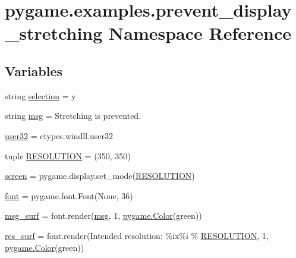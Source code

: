 \hypertarget{namespacepygame_1_1examples_1_1prevent__display__stretching}{}\section{pygame.\+examples.\+prevent\+\_\+display\+\_\+stretching Namespace Reference}
\label{namespacepygame_1_1examples_1_1prevent__display__stretching}
\subsection*{Variables}
\begin{DoxyCompactItemize}
\item 
string \hyperlink{namespacepygame_1_1examples_1_1prevent__display__stretching_a034b9f07d55d11964ead7f0ddf6b0615}{selection} = \textquotesingle{}y\textquotesingle{}
\item 
string \hyperlink{namespacepygame_1_1examples_1_1prevent__display__stretching_a86476f6ddd32f6569d5ceb1c00d9cb86}{msg} = \textquotesingle{}Stretching is prevented.\textquotesingle{}
\item 
\hyperlink{namespacepygame_1_1examples_1_1prevent__display__stretching_a39af9ada0af856b295ebcacccf44da43}{user32} = ctypes.\+windll.\+user32
\item 
tuple \hyperlink{namespacepygame_1_1examples_1_1prevent__display__stretching_a06b081393eecd9043fd8f990fc0b348e}{R\+E\+S\+O\+L\+U\+T\+I\+ON} = (350, 350)
\item 
\hyperlink{namespacepygame_1_1examples_1_1prevent__display__stretching_ace43e5146d2035a456e7a97755618f55}{screen} = pygame.\+display.\+set\+\_\+mode(\hyperlink{namespacepygame_1_1examples_1_1prevent__display__stretching_a06b081393eecd9043fd8f990fc0b348e}{R\+E\+S\+O\+L\+U\+T\+I\+ON})
\item 
\hyperlink{namespacepygame_1_1examples_1_1prevent__display__stretching_a8f62218f54f4d1e72291f4d24b271cec}{font} = pygame.\+font.\+Font(None, 36)
\item 
\hyperlink{namespacepygame_1_1examples_1_1prevent__display__stretching_ad84b8dee76a22eaf19f3e21f8e2df9b8}{msg\+\_\+surf} = font.\+render(\hyperlink{namespacepygame_1_1examples_1_1prevent__display__stretching_a86476f6ddd32f6569d5ceb1c00d9cb86}{msg}, 1, \hyperlink{namespacepygame_ad27cf54b626cb073b189d7171af414fb}{pygame.\+Color}(\textquotesingle{}green\textquotesingle{}))
\item 
\hyperlink{namespacepygame_1_1examples_1_1prevent__display__stretching_a428b54410e1aa5aa2304d436aaba0a36}{res\+\_\+surf} = font.\+render(\textquotesingle{}Intended resolution\+: \%ix\%i\textquotesingle{} \% \hyperlink{namespacepygame_1_1examples_1_1prevent__display__stretching_a06b081393eecd9043fd8f990fc0b348e}{R\+E\+S\+O\+L\+U\+T\+I\+ON}, 1, \hyperlink{namespacepygame_ad27cf54b626cb073b189d7171af414fb}{pygame.\+Color}(\textquotesingle{}green\textquotesingle{}))

\end{DoxyCompactItemize}
